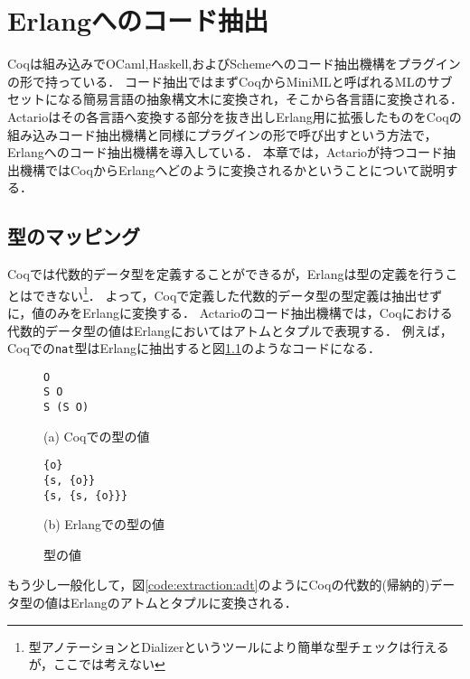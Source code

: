 \chapter{Erlangへのコード抽出}
\label{chapter:extraction}

Coqは組み込みでOCaml,Haskell,およびSchemeへのコード抽出機構をプラグインの形で持っている．
コード抽出ではまずCoqからMiniMLと呼ばれるMLのサブセットになる簡易言語の抽象構文木に変換され，そこから各言語に変換される．
Actarioはその各言語へ変換する部分を抜き出しErlang用に拡張したものをCoqの組み込みコード抽出機構と同様にプラグインの形で呼び出すという方法で，Erlangへのコード抽出機構を導入している．
本章では，Actarioが持つコード抽出機構ではCoqからErlangへどのように変換されるかということについて説明する．

\section{型のマッピング}

Coqでは代数的データ型を定義することができるが，Erlangは型の定義を行うことはできない\footnote{型アノテーションとDializerというツールにより簡単な型チェックは行えるが，ここでは考えない}．
よって，Coqで定義した代数的データ型の型定義は抽出せずに，値のみをErlangに変換する．
Actarioのコード抽出機構では，Coqにおける代数的データ型の値はErlangにおいてはアトムとタプルで表現する．
例えば，Coqでの\texttt{nat}型はErlangに抽出すると図\ref{code:extraction:datamapping-nat}のようなコードになる．

\begin{figure}\centering
\begin{minipage}{0.4\textwidth}\centering
\begin{lstlisting}[frame=single,numbers=none,xleftmargin=0pt]
O
S O
S (S O)
\end{lstlisting}
(a) Coqでの型の値
\end{minipage}
\hspace*{3ex}
\begin{minipage}{0.4\textwidth}\centering
\begin{lstlisting}[frame=single,numbers=none,xleftmargin=0pt]
{o}
{s, {o}}
{s, {s, {o}}}
\end{lstlisting}
(b) Erlangでの型の値
\end{minipage}
\caption{型の値}\label{code:extraction:datamapping-nat}
\end{figure}

もう少し一般化して，図\ref{code:extraction:adt}のようにCoqの代数的(帰納的)データ型の値はErlangのアトムとタプルに変換される．

